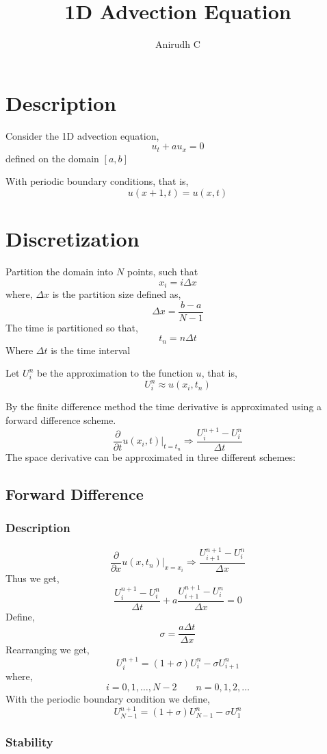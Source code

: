 \documentclass[11pt]{article}
\author{Anirudh C}
\date{}
\title{1D Advection Equation}
\begin{document}
\maketitle
\tableofcontents

\section{Description}
\label{sec:org7c9dfc4}
Consider the 1D advection equation,
$$u_t + a u_x = 0$$
defined on the domain \([a,b]\)

With periodic boundary conditions, that is,
$$u(x+1,t) = u(x,t)$$
\section{Discretization}
\label{sec:org42636e3}
Partition the domain into \(N\) points, such that
$$x_i = i \Delta x$$
where, \(\Delta x\) is the partition size defined as,
$$\Delta x = \frac{b - a}{N-1}$$
The time is partitioned so that,
$$t_n = n \Delta t$$
Where \(\Delta t\) is the time interval

Let \(U_i^n\) be the approximation to the function \(u\), that is,
$$U_i^n \approx u(x_i,t_n)$$

By the finite difference method the time derivative is approximated using a forward difference scheme.
$$\frac{\partial}{\partial t} u(x_i,t) \bigg|_{t=t_n} \Rightarrow \frac{U_i^{n+1} - U_i^n}{\Delta t}$$
The space derivative can be approximated in three different schemes:
\subsection{Forward Difference}
\label{sec:orgaeab8ce}
\subsubsection{Description}
\label{sec:orgb9f309e}
$$\frac{\partial}{\partial x} u(x,t_n) \bigg|_{x=x_i} \Rightarrow \frac{U_{i+1}^{n+1} - U_i^n}{\Delta x}$$
Thus we get,
$$\frac{U_i^{n+1} - U_i^n}{\Delta t} + a \frac{U_{i+1}^{n+1} - U_i^n}{\Delta x} = 0$$
Define,
$$\sigma = \frac{a \Delta t}{\Delta x}$$
Rearranging we get,
$$U_i^{n+1} = \left( 1 + \sigma \right) U_i^n - \sigma U_{i+1}^n$$
where,
$$i=0,1,\ldots,N-2 \qquad n = 0,1,2,\ldots$$
With the periodic boundary condition we define,
$$U_{N-1}^{n+1} = \left( 1 + \sigma \right) U_{N-1}^n - \sigma U_{1}^n$$
\subsubsection{Stability}
\label{sec:orge836e3c}
\end{document}
